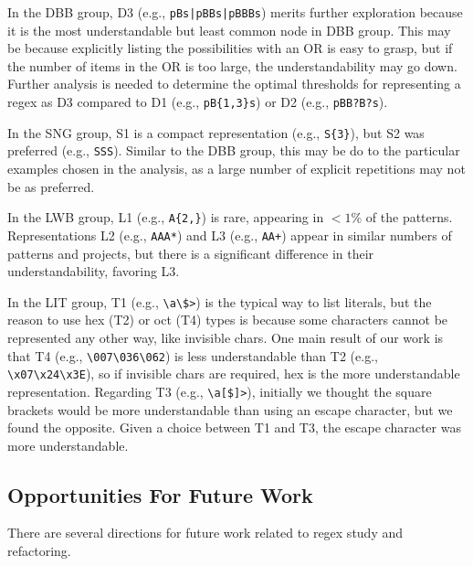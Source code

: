 
In the DBB group, D3 (e.g., \verb!pBs|pBBs|pBBBs!) merits further exploration because it is the most understandable but least common node in DBB group.  This may be because explicitly listing the possibilities with an OR is easy to grasp, but if the number of items in the OR is too large, the understandability may go down. Further analysis is needed to determine the optimal thresholds for representing a regex as D3 compared to D1 (e.g., \verb!pB{1,3}s!) or D2 (e.g., \verb!pBB?B?s!).


In the SNG group, S1 is a compact representation (e.g., \verb!S{3}!), but S2 was preferred (e.g., \verb!SSS!). Similar to the DBB group, this may be do to the particular examples chosen in the analysis, as a large number of explicit repetitions may not be as preferred.

In the LWB group,  L1 (e.g., \verb!A{2,}!) is rare, appearing in $<1$\% of the patterns. Representations L2 (e.g., \verb!AAA*!) and L3 (e.g., \verb!AA+!) appear in similar numbers of patterns and projects, but there is a significant difference in their understandability, favoring L3.

In the LIT group, T1 (e.g., \verb!\a\$>!) is the typical way to list literals, but the reason to use hex (T2) or oct (T4) types is because some characters cannot be represented any other way, like invisible chars.  One main result of our work is that  T4 (e.g., \verb!\007\036\062!) is  less understandable   than T2 (e.g., \verb!\x07\x24\x3E!), so if invisible chars are required, hex is the more understandable representation.
Regarding T3 (e.g., \verb!\a[$]>!), initially we thought the square brackets would be more understandable than using an escape character,  but we found the opposite. Given a choice between T1 and T3, the escape character was more understandable.

\subsection{Opportunities For Future Work}
There are several directions for future work related to regex study and refactoring.

